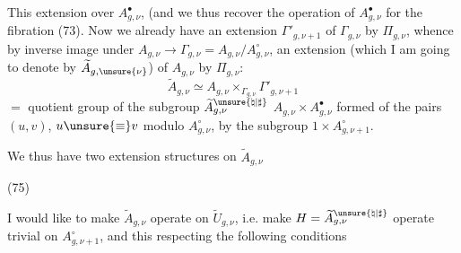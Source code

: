  This extension   over \(A_{g,\nu}^{\bullet}\),  (and we thus recover the operation of \(A_{g,\nu}^{\bullet}\) for the fibration (73). Now we already have an extension \(\Gamma'_{g,\nu+1}\) of \(\Gamma_{g,\nu}\) by \(\Pi_{g,\nu}\), whence by inverse image under \(A_{g,\nu}\to\Gamma_{g,\nu}=A_{g,\nu}/A_{g,\nu}^{\circ}\), an extension (which I am going to denote by \(\widetilde A_{g,\unsure{\nu}}\)) of \(A_{g,\nu}\) by \(\Pi_{g,\nu}\):
\[
 \widetilde A_{g,\nu}\simeq A_{g,\nu}\mathbin{\times}_{\Gamma_{g,\nu}}\Gamma'_{g,\nu+1}
 \tag{74}
\]
\(=\) quotient group of the subgroup  \(\widetilde A_{g,\nu}^{\unsure{\natural|\sharp}}\)  \(A_{g,\nu}\times A_{g,\nu}^{\bullet}\) formed of the pairs \((u,v)\), \(u\unsure{\equiv}v\)  modulo \(A_{g,\nu}^{\circ}\), by the subgroup  \(1\times A_{g,\nu+1}^{\circ}\).

We thus have two  extension structures on \(\widetilde A_{g,\nu}\)

(75) 



I would like to make \(\widetilde A_{g,\nu}\) operate on \(\widetilde U_{g,\nu}\), i.e. make  \(H=\widetilde A_{g,\nu}^{\unsure{\natural|\sharp}}\) operate   trivial on \(A_{g,\nu+1}^{\circ}\), and this respecting the following conditions

